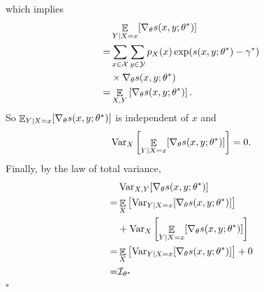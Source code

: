 \documentclass[11pt,a4paper]{article}
\newcommand{\qed}{\square}
\DeclareMathOperator{\E}{\mathbb{E}}
\newcommand{\var}{\operatorname{Var}}
\newcommand{\gtheta}{\ensuremath \nabla_{\theta}}
\newcommand{\str}[3]{s(#1, #2; #3)}
\newcommand{\fisher}{\mathcal{I}_{\theta^*}}
\begin{document}
which implies
\begin{equation*}
\begin{aligned}
  & \E_{Y|X = x}[\gtheta \str{x}{y}{\theta^*}] \\
= & \sum_{x\in\mathcal{X}} \sum_{y\in\mathcal{Y}} p_X(x)\exp( \str{x}{y}{\theta^*} - \gamma^*) \\
& \times \gtheta \str{x}{y}{\theta^*} \\
= & \E_{X, Y} \left[ \gtheta \str{x}{y}{\theta^*}\right]. 
\end{aligned}
\end{equation*}
So $\E_{Y|X = x}[\gtheta \str{x}{y}{\theta^*}]$ is independent of $x$ and 
\[
\var_X \left[\E_{Y|X = x}[\gtheta \str{x}{y}{\theta^*}] \right] = 0. 
\]
Finally, by the law of total variance, 
\begin{equation*}
\begin{aligned}
  & \var_{X, Y}[\gtheta \str{x}{y}{\theta^*}] \\
= & \E_X \left[ \var_{Y|X=x}[\gtheta \str{x}{y}{\theta^*}]\right] \\ 
& + \var_{X} \left[ \E_{Y|X = x}[\gtheta \str{x}{y}{\theta^*}]\right]  \\
= & \E_X \left[ \var_{Y|X=x}[\gtheta \str{x}{y}{\theta^*}]\right] + 0\\
= & \fisher 
\end{aligned}
\end{equation*}
$\qed$
\end{document}
